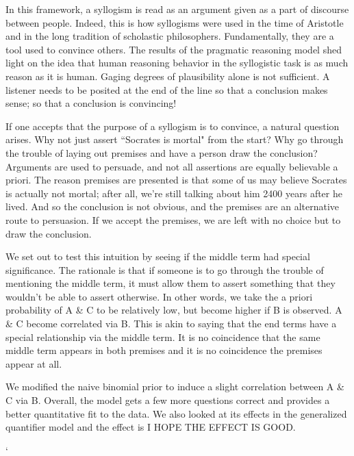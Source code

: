 \documentclass[10pt,letterpaper]{article}
\begin{document}
In this framework, a syllogism is read as an argument given as a part of discourse between people. Indeed, this is how syllogisms were used in the time of Aristotle and in the long tradition of scholastic philosophers. Fundamentally, they are a tool used to convince others. The results of the pragmatic reasoning model shed light on the idea that human reasoning behavior in the syllogistic task is as much reason as it is human. Gaging degrees of plausibility alone is not sufficient. A listener needs to be posited at the end of the line so that a conclusion makes sense; so that a conclusion is convincing!

If one accepts that the purpose of a syllogism is to convince, a natural question arises. Why not just assert ``Socrates is mortal" from the start? Why go through the trouble of laying out premises and have a person draw the conclusion? Arguments are used to persuade, and not all assertions are equally believable a priori. The reason premises are presented is that some of us may believe Socrates is actually not mortal; after all, we're still talking about him 2400 years after he lived. And so the conclusion is not obvious, and the premises are an alternative route to persuasion. If we accept the premises, we are left with no choice but to draw the conclusion.

We set out to test this intuition by seeing if the middle term had special significance. The rationale is that if someone is to go through the trouble of mentioning the middle term, it must allow them to assert something that they wouldn't be able to assert otherwise. In other words, we take the a priori probability of A \& C to be relatively low, but become higher if B is observed. A \& C become correlated via B. This is akin to saying that the end terms have a special relationship via the middle term. It is no coincidence that the same middle term appears in both premises and it is no coincidence the premises appear at all. 

We modified the naive binomial prior to induce a slight correlation between A \& C via B. Overall, the model gets a few more questions correct and provides a better quantitative fit to the data. We also looked at its effects in the generalized quantifier model and the effect is I HOPE THE EFFECT IS GOOD. 



\setlength{\bibleftmargin}{.125in}`
\setlength{\bibindent}{-\bibleftmargin}


\end{document}
